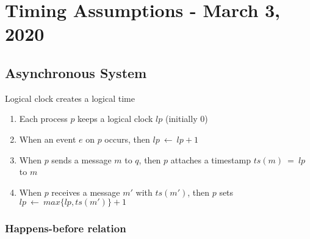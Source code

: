 \documentclass{article}
\begin{document}
	\section{Timing Assumptions - March 3, 2020}
	\begin{adjustwidth}{2em}{2em}
		\subsection{Asynchronous System}
		\begin{adjustwidth}{2em}{2em}
			Logical clock creates a logical time
			\begin{enumerate}[-]
				\item Each process $p$ keeps a logical clock $lp$ (initially 0)
				\item When an event $e$ on $p$ occurs, then $lp \ \leftarrow \ lp + 1$
				\item When $p$ sends a message $m$ to $q$, then $p$ attaches a timestamp $ts(m) \ = \ lp$ to $m$
				\item When $p$ receives a message $m'$ with $ts(m')$, then $p$ sets $lp \ \leftarrow \ max\{lp, ts(m')\} + 1$
			\end{enumerate}
			\subsubsection{Happens-before relation}
			\begin{adjustwidth}{2em}{}
				 \\
				\hfill \\
\end{adjustwidth}
\end{adjustwidth}
\end{adjustwidth}
\end{document}
